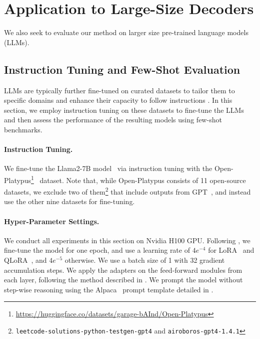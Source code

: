 \vspace{-0.5em}
\section{Application to Large-Size Decoders}  \label{sec:exp:large}
\vspace{-0.5em}

We also seek to evaluate our method on larger size pre-trained language models (LLMs). 





\subsection{Instruction Tuning and Few-Shot Evaluation} 

LLMs are typically further fine-tuned on curated datasets to tailor them to specific domains and enhance their capacity to follow instructions \citep{wang_23, alpaca, mukherjee_23}. In this section, we employ instruction tuning on these datasets to fine-tune the LLMs and then assess the performance of the resulting models using few-shot benchmarks.

\paragraph{Instruction Tuning.} 
We fine-tune the \mbox{Llama2-7B} model~\citep{touvron_23}
via instruction tuning with the Open-Platypus\footnote{\url{https://huggingface.co/datasets/garage-bAInd/Open-Platypus}}~\citep{lee_23} dataset.
Note that, while Open-Platypus consists of 11 open-source datasets, 
we exclude two of them\footnote{\texttt{leetcode-solutions-python-testgen-gpt4} and \texttt{airoboros-gpt4-1.4.1}} that include outputs from GPT~\cite{DBLP:journals/corr/abs-2303-08774}, and instead use the other nine datasets for fine-tuning. 


\paragraph{Hyper-Parameter Settings.} We conduct all experiments in this section on Nvidia H100 GPU. Following \citet{lee_23}, we fine-tune the model for one epoch, and use a learning rate of $4e^{-4}$ for LoRA~\citep{hu_22} and QLoRA~\citep{dettmers_23}, and $4e^{-5}$ otherwise. We use a batch size of 1 with 32 gradient accumulation steps. We apply the adapters on the feed-forward modules from each layer, following the method described in \citet{he_22}. We prompt the model without step-wise reasoning using the Alpaca~\citep{alpaca} prompt template detailed in .



